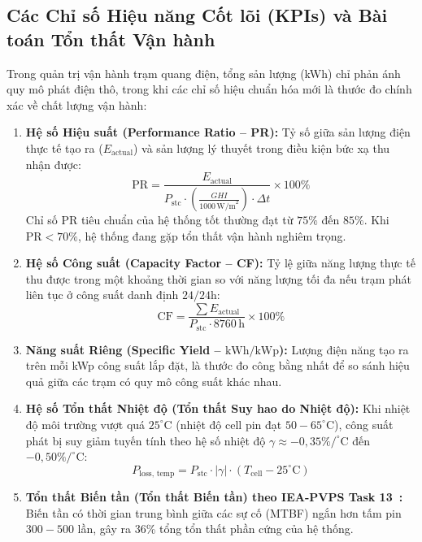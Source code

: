 \documentclass[12pt, a4paper]{report}
\begin{document}
\subsection{Các Chỉ số Hiệu năng Cốt lõi (KPIs) và Bài toán Tổn thất Vận hành}
Trong quản trị vận hành trạm quang điện, tổng sản lượng (kWh) chỉ phản ánh quy mô phát điện thô, trong khi các chỉ số hiệu chuẩn hóa mới là thước đo chính xác về chất lượng vận hành:
\begin{enumerate}[label=\arabic*., leftmargin=*]
    \item \textbf{Hệ số Hiệu suất (Performance Ratio -- PR):} Tỷ số giữa sản lượng điện thực tế tạo ra ($E_{\text{actual}}$) và sản lượng lý thuyết trong điều kiện bức xạ thu nhận được:
    \begin{equation}
        \text{PR} = \frac{E_{\text{actual}}}{P_{\text{stc}} \cdot \left(\frac{GHI}{1000\,\text{W/m}^2}\right) \cdot \Delta t} \times 100\%
    \end{equation}
    Chỉ số PR tiêu chuẩn của hệ thống tốt thường đạt từ $75\%$ đến $85\%$. Khi $\text{PR} < 70\%$, hệ thống đang gặp tổn thất vận hành nghiêm trọng.
    
    \item \textbf{Hệ số Công suất (Capacity Factor -- CF):} Tỷ lệ giữa năng lượng thực tế thu được trong một khoảng thời gian so với năng lượng tối đa nếu trạm phát liên tục ở công suất danh định $24/24\text{h}$:
    \begin{equation}
        \text{CF} = \frac{\sum E_{\text{actual}}}{P_{\text{stc}} \cdot 8760\,\text{h}} \times 100\%
    \end{equation}
    
    \item \textbf{Năng suất Riêng (Specific Yield -- $\text{kWh/kWp}$):} Lượng điện năng tạo ra trên mỗi kWp công suất lắp đặt, là thước đo công bằng nhất để so sánh hiệu quả giữa các trạm có quy mô công suất khác nhau.

    \item \textbf{Hệ số Tổn thất Nhiệt độ (Tổn thất Suy hao do Nhiệt độ):} Khi nhiệt độ môi trường vượt quá $25^\circ\text{C}$ (nhiệt độ cell pin đạt $50-65^\circ\text{C}$), công suất phát bị suy giảm tuyến tính theo hệ số nhiệt độ $\gamma \approx -0{,}35\%/^\circ\text{C}$ đến $-0{,}50\%/^\circ\text{C}$:
    \begin{equation}
        P_{\text{loss, temp}} = P_{\text{stc}} \cdot |\gamma| \cdot (T_{\text{cell}} - 25^\circ\text{C})
    \end{equation}
    
    \item \textbf{Tổn thất Biến tần (Tổn thất Biến tần) theo IEA-PVPS Task 13~\cite{iea2023pvps}:} Biến tần có thời gian trung bình giữa các sự cố (MTBF) ngắn hơn tấm pin $300-500$ lần, gây ra 36\% tổng tổn thất phần cứng của hệ thống.
\end{enumerate}
\end{document}
